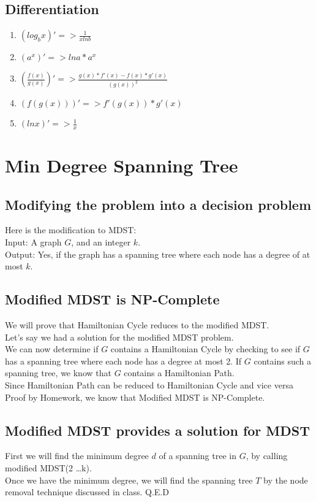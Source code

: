 \documentclass[9pt,twocolumn]{article}
\begin{document}
\subsection{Differentiation}
\begin{enumerate}
    \item $(log_bx)' => \frac{1}{xlnb}$
    \item $(a^x)' => lna*a^x$
    \item $(\frac{f(x)}{g(x)})' => \frac{g(x)*f'(x)-f(x)*g'(x)}{(g(x))^2}$
    \item $(f(g(x)))' => f'(g(x))*g'(x)$
    \item $(lnx)' => \frac{1}{x}$
\end{enumerate}

\section{ Min Degree Spanning Tree }
\subsection{Modifying the problem into a decision problem}
Here is the modification to MDST:\\
Input: A graph $G$, and an integer $k$.\\
Output: Yes, if the graph has a spanning tree where each node has a degree of at most $k$.\\
\subsection{Modified MDST is NP-Complete}
We will prove that Hamiltonian Cycle reduces to the modified MDST.\\
Let's say we had a solution for the modified MDST problem.\\
We can now determine if $G$ contains a Hamiltonian Cycle by checking to see if $G$ has a spanning tree where each node has a degree at most 2. If $G$ contains such a spanning tree, we know that $G$ contains a Hamiltonian Path.\\
Since Hamiltonian Path can be reduced to Hamiltonian Cycle and vice versa {Proof by Homework}, we know that Modified MDST is NP-Complete.
\subsection{Modified MDST provides a solution for MDST}
First we will find the minimum degree $d$ of a spanning tree in $G$, by calling modified MDST(2 \dots k).\\
Once we have the minimum degree, we will find the spanning tree $T$ by the node removal technique discussed in class.
Q.E.D
\end{document}
